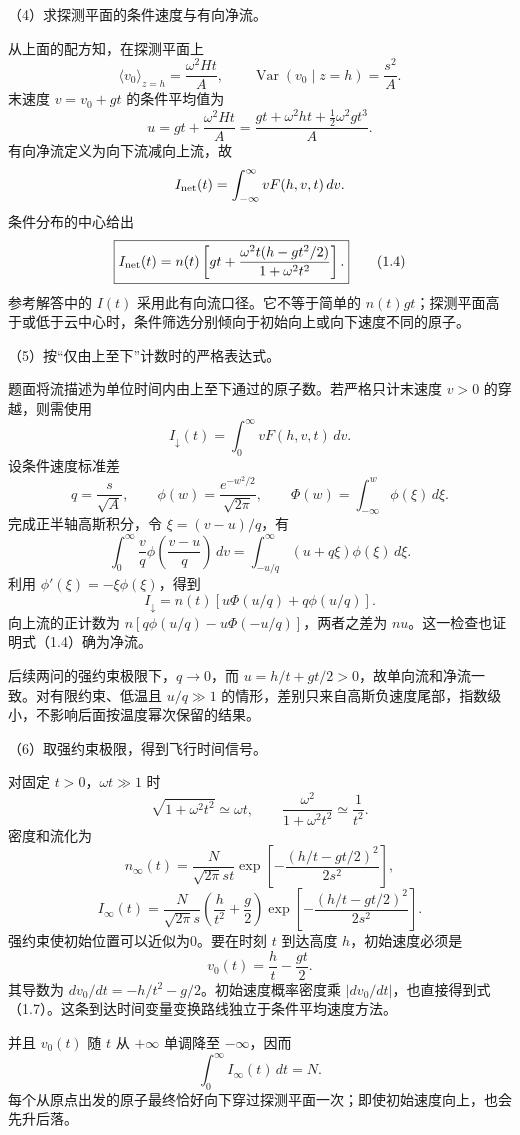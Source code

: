 \documentclass[12pt,a4paper,fontset=fandol]{ctexart}
\begin{document}
（4）求探测平面的条件速度与有向净流。

从上面的配方知，在探测平面上 \[
\langle v_0\rangle_{z=h}=\frac{\omega^2Ht}{A},
\qquad
\operatorname{Var}(v_0\mid z=h)=\frac{s^2}{A}.
\] 末速度 \(v=v_0+gt\) 的条件平均值为 \[
u=gt+\frac{\omega^2Ht}{A}
=\frac{gt+\omega^2ht+\tfrac12\omega^2gt^3}{A}.
\] 有向净流定义为向下流减向上流，故 \[
I_{\rm net}(t)=\int_{-\infty}^{\infty}vF(h,v,t)\,dv.
\] 条件分布的中心给出 \[
\boxed{I_{\rm net}(t)=n(t)
\left[gt+\frac{\omega^2t(h-gt^2/2)}{1+\omega^2t^2}\right].}\tag{1.4}
\] 参考解答中的 \(I(t)\) 采用此有向流口径。它不等于简单的
\(n(t)gt\)；探测平面高于或低于云中心时，条件筛选分别倾向于初始向上或向下速度不同的原子。

（5）按``仅由上至下''计数时的严格表达式。

题面将流描述为单位时间内由上至下通过的原子数。若严格只计末速度 \(v>0\)
的穿越，则需使用 \[
I_\downarrow(t)=\int_0^\infty vF(h,v,t)\,dv.
\] 设条件速度标准差 \[
q=\frac{s}{\sqrt A},\qquad
\phi(w)=\frac{e^{-w^2/2}}{\sqrt{2\pi}},\qquad
\Phi(w)=\int_{-\infty}^{w}\phi(\xi)\,d\xi.
\] 完成正半轴高斯积分，令 \(\xi=(v-u)/q\)，有 \[
\int_0^\infty \frac{v}{q}\phi\!\left(\frac{v-u}{q}\right)\,dv
=\int_{-u/q}^{\infty}(u+q\xi)\phi(\xi)\,d\xi.
\] 利用 \(\phi'(\xi)=-\xi\phi(\xi)\)，得到 \[
\boxed{I_\downarrow
=n(t)\left[u\Phi(u/q)+q\phi(u/q)\right].}\tag{1.5}
\] 向上流的正计数为 \(n[q\phi(u/q)-u\Phi(-u/q)]\)，两者之差为
\(nu\)。这一检查也证明式（1.4）确为净流。

后续两问的强约束极限下，\(q\to0\)，而
\(u=h/t+gt/2>0\)，故单向流和净流一致。对有限约束、低温且 \(u/q\gg1\)
的情形，差别只来自高斯负速度尾部，指数级小，不影响后面按温度幂次保留的结果。

（6）取强约束极限，得到飞行时间信号。

对固定 \(t>0\)，\(\omega t\gg1\) 时 \[
\sqrt{1+\omega^2t^2}\simeq\omega t,\qquad
\frac{\omega^2}{1+\omega^2t^2}\simeq\frac1{t^2}.
\] 密度和流化为 \[
\boxed{n_\infty(t)=\frac{N}{\sqrt{2\pi}st}
\exp\!\left[-\frac{(h/t-gt/2)^2}{2s^2}\right],}\tag{1.6}
\] \[
\boxed{I_\infty(t)=\frac{N}{\sqrt{2\pi}s}
\left(\frac{h}{t^2}+\frac g2\right)
\exp\!\left[-\frac{(h/t-gt/2)^2}{2s^2}\right].}\tag{1.7}
\] 强约束使初始位置可以近似为0。要在时刻 \(t\) 到达高度
\(h\)，初始速度必须是 \[
v_0(t)=\frac ht-\frac{gt}{2}.
\] 其导数为 \(dv_0/dt=-h/t^2-g/2\)。初始速度概率密度乘
\(|dv_0/dt|\)，也直接得到式（1.7）。这条到达时间变量变换路线独立于条件平均速度方法。

并且 \(v_0(t)\) 随 \(t\) 从 \(+\infty\) 单调降至 \(-\infty\)，因而 \[
\int_0^\infty I_\infty(t)\,dt=N.
\]
每个从原点出发的原子最终恰好向下穿过探测平面一次；即使初始速度向上，也会先升后落。
\end{document}
